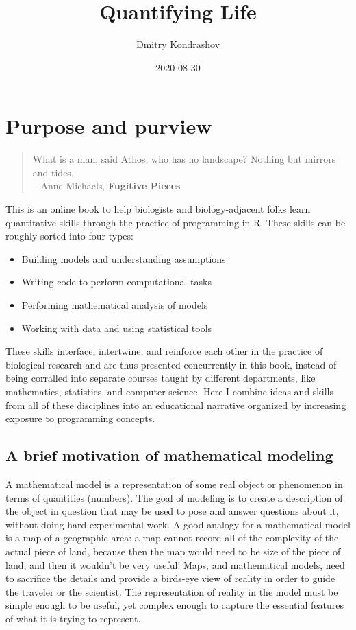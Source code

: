 \documentclass[
]{book}
\title{Quantifying Life}
\author{Dmitry Kondrashov}
\date{2020-08-30}
\begin{document}
\maketitle

{
\setcounter{tocdepth}{1}
\tableofcontents
}
\hypertarget{purpose-and-purview}{%
\chapter{Purpose and purview}\label{purpose-and-purview}}

\begin{quote}
What is a man, said Athos, who has no landscape? Nothing but mirrors and tides.\\
-- Anne Michaels, \textbf{Fugitive Pieces}
\end{quote}

This is an online book to help biologists and biology-adjacent folks learn quantitative skills through the practice of programming in R. These skills can be roughly sorted into four types:

\begin{itemize}
\item
  Building models and understanding assumptions
\item
  Writing code to perform computational tasks
\item
  Performing mathematical analysis of models
\item
  Working with data and using statistical tools
\end{itemize}

These skills interface, intertwine, and reinforce each other in the practice of biological research and are thus presented concurrently in this book, instead of being corralled into separate courses taught by different departments, like mathematics, statistics, and computer science. Here I combine ideas and skills from all of these disciplines into an educational narrative organized by increasing exposure to programming concepts.

\hypertarget{a-brief-motivation-of-mathematical-modeling}{%
\section{A brief motivation of mathematical modeling}\label{a-brief-motivation-of-mathematical-modeling}}

A mathematical model  is a representation of some real object or phenomenon in terms of quantities (numbers). The goal of modeling is to create a description of the object in question that may be used to pose and answer questions about it, without doing hard experimental work. A good analogy for a mathematical model is a map of a geographic area: a map cannot record all of the complexity of the actual piece of land, because then the map would need to be size of the piece of land, and then it wouldn't be very useful! Maps, and mathematical models, need to sacrifice the details and provide a birds-eye view of reality in order to guide the traveler or the scientist. The representation of reality in the model must be simple enough to be useful, yet complex enough to capture the essential features of what it is trying to represent.
\end{document}

